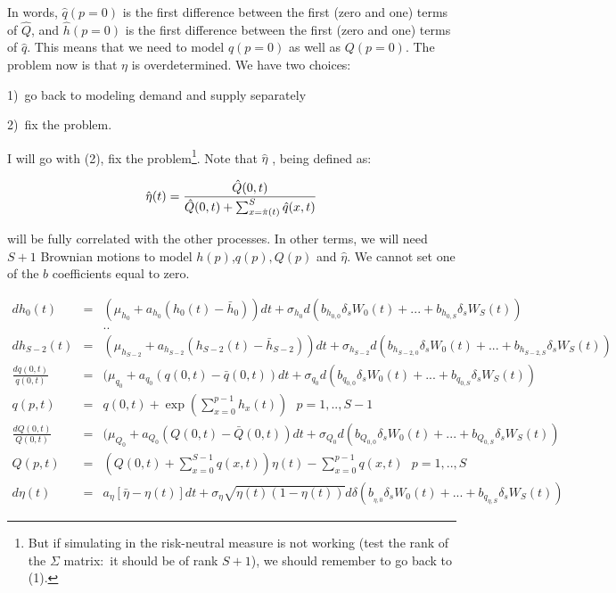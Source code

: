 \documentclass{article}
\begin{document}
In words, $\hat{q}(p=0)$ is the first difference between the first (zero and
one) terms of $\hat{Q}$, and $\hat{h}(p=0)$ is the first difference between
the first (zero and one) terms of $\hat{q}$. This means that we need to
model $q(p=0)$ as well as $Q(p=0)$. The problem now is that $\eta $ is
overdetermined. We have two choices:

1)\ go back to modeling demand and supply separately

2)\ fix the problem.

I will go with (2), fix the problem\footnote{%
But if simulating in the risk-neutral measure is not working (test the rank
of the $\Sigma $ matrix:\ it should be of rank $S+1$), we should remember to
go back to (1).}. Note that $\hat{\eta}$ , being defined as:

\begin{equation*}
\hat{\eta}(t)=\frac{\hat{Q}(0,t)}{\hat{Q}(0,t)+\sum_{x=\hat{\pi}(t)}^{S}\hat{%
q}(x,t)}
\end{equation*}

will be fully correlated with the other processes. In other terms, we will
need $S+1$ Brownian motions to model $h(p)$,$q(p),Q(p)$ and $\hat{\eta}$. We
cannot set one of the $b$ coefficients equal to zero.

\begin{eqnarray*}
dh_{0}(t) &=&(\mu _{h_{0}}+a_{h_{0}}(h_{0}(t)-\bar{h}_{0}))dt+\sigma
_{h_{0}}d(b_{h_{0,0}}\delta _{s}W_{0}(t)+...+b_{h_{0,S}}\delta _{s}W_{S}(t))
\\
&&.. \\
dh_{S-2}(t) &=&(\mu _{h_{S-2}}+a_{h_{S-2}}(h_{S-2}(t)-\bar{h}%
_{S-2}))dt+\sigma _{h_{S-2}}d(b_{h_{S-2,0}}\delta
_{s}W_{0}(t)+...+b_{h_{S-2,S}}\delta _{s}W_{S}(t)) \\
\frac{dq(0,t)}{q(0,t)} &=&(\mu _{q_{0}}+a_{q_{0}}(q(0,t)-\bar{q}%
(0,t))dt+\sigma _{q_{0}}d(b_{q_{0,0}}\delta
_{s}W_{0}(t)+...+b_{q_{0,S}}\delta _{s}W_{S}(t))\text{ \ \ \ \ } \\
q(p,t) &=&q(0,t)+\exp (\sum_{x=0}^{p-1}h_{x}(t))\text{ \ \ \ \ }p=1,..,S-1 \\
\frac{dQ(0,t)}{Q(0,t)} &=&(\mu _{Q_{0}}+a_{Q_{0}}(Q(0,t)-\bar{Q}%
(0,t))dt+\sigma _{Q_{0}}d(b_{Q_{0,0}}\delta
_{s}W_{0}(t)+...+b_{Q_{0,S}}\delta _{s}W_{S}(t)) \\
Q(p,t) &=&(Q(0,t)+\sum_{x=0}^{S-1}q(x,t))\eta (t)-\sum_{x=0}^{p-1}q(x,t)%
\text{ \ \ }p=1,..,S \\
d\eta (t) &=&a_{\eta }[\bar{\eta}-\eta (t)]dt+\sigma _{\eta }\sqrt{\eta
(t)(1-\eta (t))}d\delta (b_{_{\eta ,0}}\delta _{s}W_{0}(t)+...+b_{q_{\eta
,S}}\delta _{s}W_{S}(t))
\end{eqnarray*}%
\bigskip 
\end{document}

